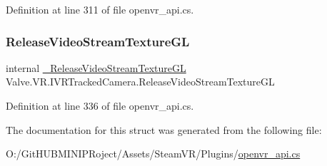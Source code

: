 Definition at line 311 of file openvr\+\_\+api.\+cs.

\mbox{\label{struct_valve_1_1_v_r_1_1_i_v_r_tracked_camera_a7cce6c8bf2795612ec4a888f5210a7e8}} 
\subsubsection{\texorpdfstring{ReleaseVideoStreamTextureGL}{ReleaseVideoStreamTextureGL}}
{\footnotesize\ttfamily internal \mbox{\hyperlink{struct_valve_1_1_v_r_1_1_i_v_r_tracked_camera_aabf5efcf29016561cc7b4108916f3632}{\+\_\+\+Release\+Video\+Stream\+Texture\+GL}} Valve.\+V\+R.\+I\+V\+R\+Tracked\+Camera.\+Release\+Video\+Stream\+Texture\+GL}



Definition at line 336 of file openvr\+\_\+api.\+cs.



The documentation for this struct was generated from the following file\+:\begin{DoxyCompactItemize}
\item 
O\+:/\+Git\+H\+U\+B\+M\+I\+N\+I\+P\+Roject/\+Assets/\+Steam\+V\+R/\+Plugins/\mbox{\hyperlink{openvr__api_8cs}{openvr\+\_\+api.\+cs}}\end{DoxyCompactItemize}
